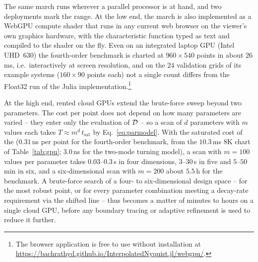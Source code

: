 The same march runs wherever a parallel processor is at hand, and two
deployments mark the range. At the low end, the march is also implemented as a
WebGPU compute shader that runs in any current web browser on the viewer's own
graphics hardware, with the characteristic function typed as text and compiled
to the shader on the fly. Even on an integrated laptop GPU (Intel UHD~630) the
fourth-order benchmark is charted at $960\times540$ points in about $26$\,ms,
i.e.\ interactively at screen resolution, and on the $24$ validation grids of
its example systems ($160\times90$ points each) not a single count differs
from the Float32 run of the Julia implementation.\footnote{The browser application is free to use without installation
at \url{https://bachrathyd.github.io/InterpolatedNyquist.jl/webgpu/}.}

At the high end, rented cloud GPUs extend the brute-force sweep beyond two
parameters. The cost per point does not depend on how many parameters are
varied -- they enter only the evaluation of $\mathcal{D}$ -- so a scan of $d$
parameters with $m$ values each takes $T\approx m^{d}\,t_{\mathrm{sat}}$ by
Eq.~\eqref{eq:parmodel}. With the saturated cost of the \GpuBest{}
($0.31$\,ns per point for the fourth-order benchmark, from the $10.3$\,ms 8K
chart of Table~\ref{tab:gpu}; $3.0$\,ns for the two-mode turning model), a
scan with $m=100$ values per parameter takes $0.03$--$0.3$\,s in four
dimensions, $3$--$30$\,s in five and $5$--$50$\,min in six, and a
six-dimensional scan with $m=200$ about $5.5$\,h for the benchmark. A
brute-force search of a four- to six-dimensional design space -- for the most
robust point, or for every parameter combination meeting a decay-rate
requirement via the shifted line -- thus becomes a matter of minutes to hours on
a single cloud GPU, before any boundary tracing or adaptive refinement is used
to reduce it further.
